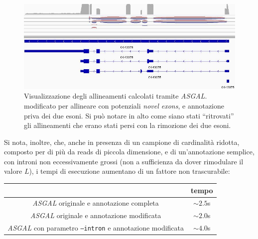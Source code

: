 \documentclass[a4paper,12pt, oneside]{book}
\begin{document}
\begin{figure}[H]
  \centering
  \includegraphics[scale = 0.55]{img/igvi.jpg}
  \caption{Visualizzazione degli allineamenti calcolati tramite \textit{ASGAL}.
    modificato per allineare con potenziali \textit{novel exons}, e annotazione
    priva dei due esoni. Si può notare in alto come siano stati ``ritrovati''
    gli allineamenti che erano stati persi con la rimozione dei due esoni.}
  \label{r3}
\end{figure}
Si nota, inoltre, che, anche in presenza di un campione di cardinalità ridotta,
composto per di più da reads di piccola dimensione, e di un'annotazione semplice,
con introni non eccessivamente grossi (non a sufficienza da dover rimodulare il
valore $L$), i tempi di esecuzione aumentano di un fattore non trascurabile:
\begin{center}
  \begin{tabular}[c]{c|c}
    \hline
     \cellcolor[gray]{0.6}&  \cellcolor[gray]{0.8}tempo \\
    \hline
    \textit{ASGAL} originale e annotazione completa & $\sim 2.5$s\\
    \hline
    \textit{ASGAL} originale e annotazione modificata & $\sim 2.0$s\\
    \hline
    \textit{ASGAL} con parametro \texttt{--intron}
    e annotazione modificata & $\sim 4.0$s   \\
    \hline
  \end{tabular}
\end{center}
\end{document}
